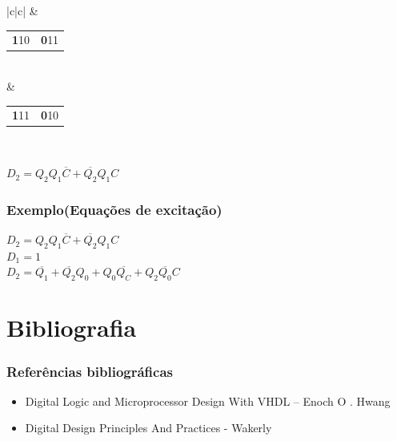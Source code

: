 \documentclass{beamer}
\begin{document}
\begin{frame}
\begin{center}
\begin{tabular}{|c|c|}
	    & \begin{tabular}{c|c} \textbf{1}10  & \textbf{0}11 \\ \end{tabular} \\
	    & \begin{tabular}{c|c} \textbf{1}11  & \textbf{0}10 \\ \end{tabular} \\
	  \hline
	\end{tabular}
      \end{center} 
      $D_2 = Q_2Q_1\overline{C} + \overline{Q_2}Q_1C$ 
\end{frame}

\begin{frame}
 \frametitle{Exemplo(Equações de excitação)} 
     $D_2 = Q_2Q_1\overline{C} + \overline{Q_2}Q_1C$  \\
     $D_1 = 1$ \\
     $D_2 = \overline{Q_1} + \overline{Q_2}Q_0 + Q_0\overline{Q_C} + Q_2\overline{Q_0}C$
\end{frame}

\section{Bibliografia}
\begin{frame}
 \frametitle{Referências bibliográficas}
 \begin{itemize}
  \item Digital Logic and Microprocessor Design With VHDL – Enoch O . Hwang
  \item Digital Design Principles And Practices - Wakerly
 \end{itemize}
\end{frame}
\end{document}
